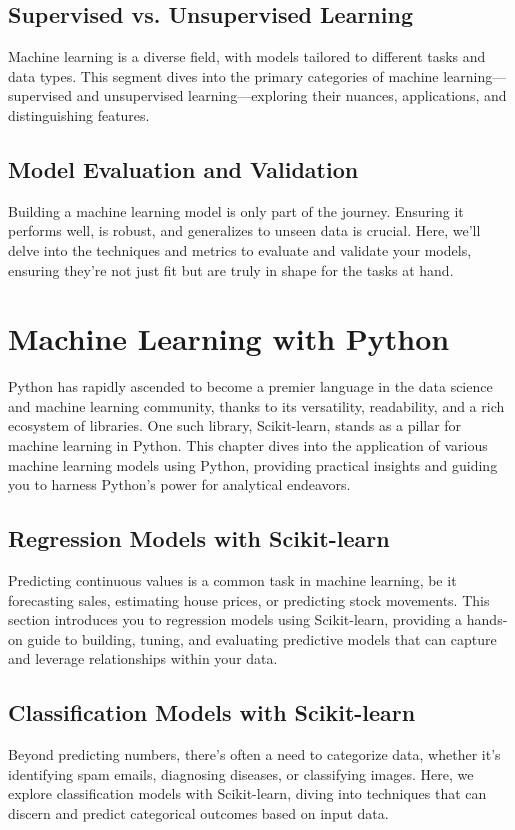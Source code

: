 \documentclass[a4paper,12pt]{book}
\begin{document}
\section{Supervised vs. Unsupervised Learning}
Machine learning is a diverse field, with models tailored to different tasks and data types. This segment dives into the primary categories of machine learning—supervised and unsupervised learning—exploring their nuances, applications, and distinguishing features.

\section{Model Evaluation and Validation}
Building a machine learning model is only part of the journey. Ensuring it performs well, is robust, and generalizes to unseen data is crucial. Here, we'll delve into the techniques and metrics to evaluate and validate your models, ensuring they're not just fit but are truly in shape for the tasks at hand.

\chapter{Machine Learning with Python}
Python has rapidly ascended to become a premier language in the data science and machine learning community, thanks to its versatility, readability, and a rich ecosystem of libraries. One such library, Scikit-learn, stands as a pillar for machine learning in Python. This chapter dives into the application of various machine learning models using Python, providing practical insights and guiding you to harness Python's power for analytical endeavors.

\section{Regression Models with Scikit-learn}
Predicting continuous values is a common task in machine learning, be it forecasting sales, estimating house prices, or predicting stock movements. This section introduces you to regression models using Scikit-learn, providing a hands-on guide to building, tuning, and evaluating predictive models that can capture and leverage relationships within your data.

\section{Classification Models with Scikit-learn}
Beyond predicting numbers, there's often a need to categorize data, whether it's identifying spam emails, diagnosing diseases, or classifying images. Here, we explore classification models with Scikit-learn, diving into techniques that can discern and predict categorical outcomes based on input data.
\end{document}
